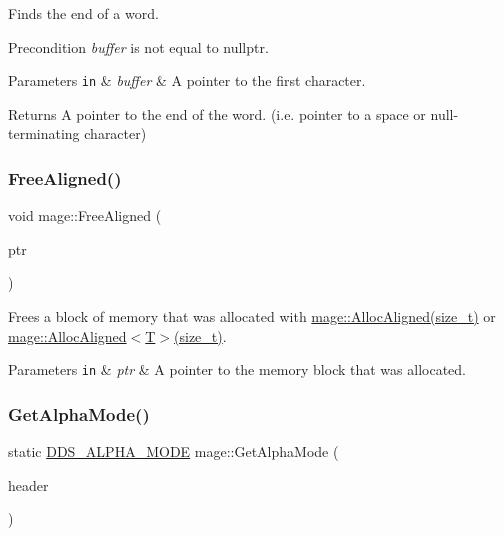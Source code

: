 Finds the end of a word.

\begin{DoxyPrecond}{Precondition}
{\itshape buffer} is not equal to {\ttfamily nullptr}. 
\end{DoxyPrecond}

\begin{DoxyParams}[1]{Parameters}
\mbox{\tt in}  & {\em buffer} & A pointer to the first character. \\
\hline
\end{DoxyParams}
\begin{DoxyReturn}{Returns}
A pointer to the end of the word. (i.\+e. pointer to a space or null-\/terminating character) 
\end{DoxyReturn}
\hypertarget{namespacemage_a401c54df21447c491c527735647b5f80}{}\label{namespacemage_a401c54df21447c491c527735647b5f80} 
\subsubsection{\texorpdfstring{Free\+Aligned()}{FreeAligned()}}
{\footnotesize\ttfamily void mage\+::\+Free\+Aligned (\begin{DoxyParamCaption}\item[{void $\ast$}]{ptr }\end{DoxyParamCaption})}

Frees a block of memory that was allocated with \hyperlink{namespacemage_a8facb28d3867eefd618db6c859d349d5}{mage\+::\+Alloc\+Aligned(size\+\_\+t)} or \hyperlink{namespacemage_a8facb28d3867eefd618db6c859d349d5}{mage\+::\+Alloc\+Aligned$<$\+T$>$(size\+\_\+t)}.


\begin{DoxyParams}[1]{Parameters}
\mbox{\tt in}  & {\em ptr} & A pointer to the memory block that was allocated. \\
\hline
\end{DoxyParams}
\hypertarget{namespacemage_afcc0891e1660f8457696cb30f4ee518a}{}\label{namespacemage_afcc0891e1660f8457696cb30f4ee518a} 
\subsubsection{\texorpdfstring{Get\+Alpha\+Mode()}{GetAlphaMode()}}
{\footnotesize\ttfamily static \hyperlink{namespacemage_a0c586a2bad862f4858900ca121ca80c2}{D\+D\+S\+\_\+\+A\+L\+P\+H\+A\+\_\+\+M\+O\+DE} mage\+::\+Get\+Alpha\+Mode (\begin{DoxyParamCaption}\item[{\+\_\+\+In\+\_\+ const \hyperlink{structmage_1_1_d_d_s___h_e_a_d_e_r}{D\+D\+S\+\_\+\+H\+E\+A\+D\+ER} $\ast$}]{header }\end{DoxyParamCaption})\hspace{0.3cm}{\ttfamily [static]}}

